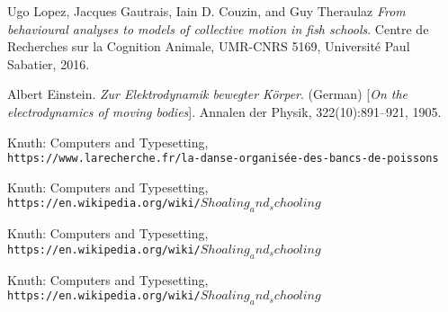 \documentclass[a4paper]{article}
\begin{document}
\begin{thebibliography}{9}
Ugo Lopez, Jacques Gautrais, Iain D. Couzin, and Guy Theraulaz
\textit{From behavioural analyses to models of collective motion in fish schools}. 
Centre de Recherches sur la Cognition Animale, UMR-CNRS 5169, Université Paul Sabatier, 2016.
 
Albert Einstein. 
\textit{Zur Elektrodynamik bewegter K{\"o}rper}. (German) 
[\textit{On the electrodynamics of moving bodies}]. 
Annalen der Physik, 322(10):891–921, 1905.
 
Knuth: Computers and Typesetting,
\\\texttt{https://www.larecherche.fr/la-danse-organisée-des-bancs-de-poissons}

Knuth: Computers and Typesetting,
\\\texttt{https://en.wikipedia.org/wiki/$Shoaling_and_schooling$}

Knuth: Computers and Typesetting,
\\\texttt{https://en.wikipedia.org/wiki/$Shoaling_and_schooling$}

Knuth: Computers and Typesetting,
\\\texttt{https://en.wikipedia.org/wiki/$Shoaling_and_schooling$}
\end{thebibliography}
\end{document}
